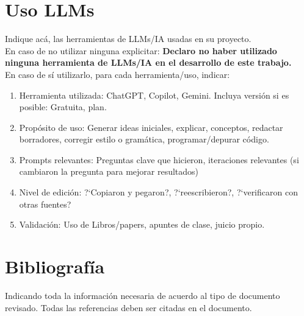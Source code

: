 \documentclass[letter, 10pt]{article}
\begin{document}
\section{Uso LLMs}
Indique ac\'a, las herramientas de LLMs/IA usadas en su proyecto. \\En caso de no utilizar ninguna explicitar:
\textbf{Declaro no haber utilizado ninguna herramienta de LLMs/IA en el desarrollo de este trabajo.}\\

\noindent En caso de s\'i utilizarlo, para cada herramienta/uso, indicar:
\begin{enumerate}
\item Herramienta utilizada: ChatGPT, Copilot, Gemini. Incluya versi\'on si es posible: Gratuita, plan.
\item Prop\'osito de uso: Generar ideas iniciales, explicar,  conceptos, redactar borradores, corregir estilo o gram\'atica, programar/depurar c\'odigo.
\item Prompts relevantes: Preguntas clave que hicieron, iteraciones relevantes (si cambiaron la pregunta para mejorar resultados)
\item Nivel de edici\'on: ?`Copiaron y pegaron?, ?`reescribieron?, ?`verificaron con otras fuentes?
\item Validaci\'on: Uso de Libros/papers, apuntes de clase, juicio propio.
\end{enumerate}


\section{Bibliograf\'ia}
Indicando toda la informaci\'on necesaria de acuerdo al tipo de documento revisado. Todas las referencias deben ser citadas en el documento.



\end{document}
